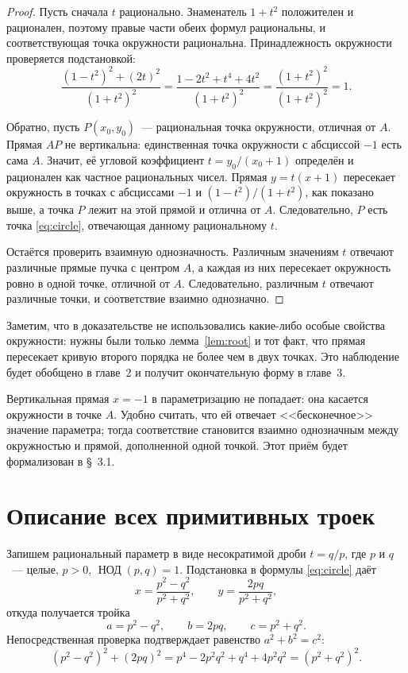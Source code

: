 \documentclass[a4paper,14pt]{extreport}
\theoremstyle{definition}
\providecommand{\gcdru}{}\renewcommand{\gcdru}{\mathop{\text{НОД}}\nolimits}
\begin{document}
\begin{proof}
Пусть сначала $t$ рационально. Знаменатель $1+t^2$ положителен и рационален,
поэтому правые части обеих формул рациональны, и соответствующая точка
окружности рациональна. Принадлежность окружности проверяется подстановкой:
\[
  \frac{(1-t^2)^2+(2t)^2}{(1+t^2)^2}
  =\frac{1-2t^2+t^4+4t^2}{(1+t^2)^2}
  =\frac{(1+t^2)^2}{(1+t^2)^2}=1 .
\]

Обратно, пусть $P(x_0,y_0)$~--- рациональная точка окружности, отличная от $A$.
Прямая $AP$ не вертикальна: единственная точка окружности с абсциссой $-1$ есть
сама $A$. Значит, её угловой коэффициент $t=y_0/(x_0+1)$ определён и рационален
как частное рациональных чисел. Прямая $y=t(x+1)$ пересекает окружность в
точках с абсциссами $-1$ и $(1-t^2)/(1+t^2)$, как показано выше, а точка $P$
лежит на этой прямой и отлична от $A$. Следовательно, $P$ есть точка
\eqref{eq:circle}, отвечающая данному рациональному $t$.

Остаётся проверить взаимную однозначность. Различным значениям $t$ отвечают
различные прямые пучка с центром $A$, а каждая из них пересекает окружность
ровно в одной точке, отличной от $A$. Следовательно, различным $t$ отвечают
различные точки, и соответствие взаимно однозначно.
\end{proof}

Заметим, что в доказательстве не использовались какие-либо особые свойства
окружности: нужны были только
лемма~\ref{lem:root} и тот факт, что прямая пересекает кривую второго порядка
не более чем в двух точках. Это наблюдение будет обобщено в главе~2 и получит
окончательную форму в главе~3.

Вертикальная прямая $x=-1$ в параметризацию не попадает: она касается
окружности в точке $A$. Удобно считать, что ей отвечает <<бесконечное>>
значение параметра; тогда соответствие становится взаимно однозначным между
окружностью и прямой, дополненной одной точкой. Этот приём будет формализован
в \S~3.1.

\section{Описание всех примитивных троек}

Запишем рациональный параметр в виде несократимой дроби $t=q/p$, где $p$ и $q$~---
целые, $p>0$, $\gcdru(p,q)=1$. Подстановка в формулы
\eqref{eq:circle} даёт
\[
  x=\frac{p^2-q^2}{p^2+q^2},\qquad y=\frac{2pq}{p^2+q^2},
\]
откуда получается тройка
\[
  a=p^2-q^2,\qquad b=2pq,\qquad c=p^2+q^2 .
\]
Непосредственная проверка подтверждает равенство $a^2+b^2=c^2$:
\[
  (p^2-q^2)^2+(2pq)^2=p^4-2p^2q^2+q^4+4p^2q^2=(p^2+q^2)^2 .
\]
\end{document}

